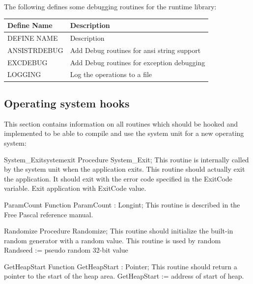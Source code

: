 \documentclass [a4paper,12pt]{article}
\begin{document}
The following defines some debugging routines for the runtime library:

\begin{longtable}{|l|p{10cm}|}
\hline
Define Name & Description \\
\hline
\endhead
\hline
\endfoot
DEFINE NAME     & Description \\
ANSISTRDEBUG    & Add Debug routines for ansi string support \\
EXCDEBUG        & Add Debug routines for exception debugging \\
LOGGING         & Log the operations to a file \\
\end{longtable}

\subsection{Operating system hooks}
\label{subsec:operating}

This section contains information on all routines which should be hooked and
implemented to be able to compile and use the system unit for a new
operating system:

\begin{functionl}{System{\_}Exit}{systemexit}
\Declaration
Procedure System{\_}Exit;
\Description
This routine is internally called by the system unit when the application
exits.
\Notes
This routine should actually exit the application. It should exit with the
error code specified in the \textsf{ExitCode} variable.
\Algorithm
Exit application with ExitCode value.
\end{functionl}

\begin{function}{ParamCount}
\Declaration
Function ParamCount : Longint;
\Description
This routine is described in the Free Pascal reference manual.
\end{function}

\begin{procedure}{Randomize}
\Declaration
Procedure Randomize;
\Description
This routine should initialize the built-in random generator with a random value.
\Notes
This routine is used by random
\Algorithm
Randseed := pseudo random 32-bit value
\end{procedure}

\begin{function}{GetHeapStart}
\Declaration
Function GetHeapStart : Pointer;
\Description
This routine should return a pointer to the start of the heap area.
\Algorithm
GetHeapStart := address of start of heap.
\end{function}
\end{document}

